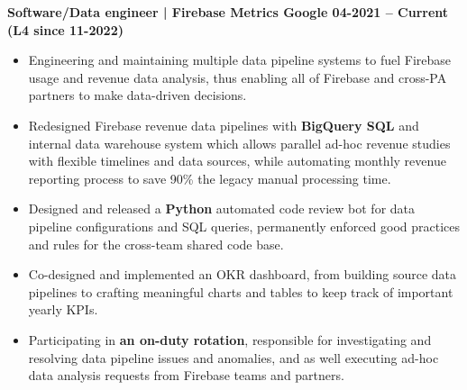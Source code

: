 \textbf{Software/Data engineer | Firebase Metrics \hspace{-10mm} \hfill Google \hfill 04-2021 -- Current (L4 since 11-2022)}\par

\begin{itemize}
        \item Engineering and maintaining multiple data pipeline systems to fuel Firebase usage and revenue data analysis, thus enabling all of Firebase and cross-PA partners to make data-driven decisions.
        \item Redesigned Firebase revenue data pipelines with \textbf{BigQuery SQL} and internal data warehouse system which allows parallel ad-hoc revenue studies with flexible timelines and data sources, while automating monthly revenue reporting process to save {90{\%}} the legacy manual processing time.
	\item Designed and released a \textbf{Python} automated code review bot for data pipeline configurations and SQL queries, permanently enforced good practices and rules for the cross-team shared code base.
        \item Co-designed and implemented an OKR dashboard, from building source data pipelines to crafting meaningful charts and tables to keep track of important yearly KPIs.
	\item Participating in \textbf{an on-duty rotation}, responsible for investigating and resolving data pipeline issues and anomalies, and as well executing ad-hoc data analysis requests from Firebase teams and partners.
\end{itemize}\par
